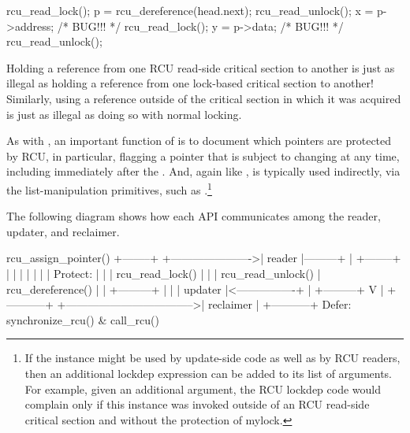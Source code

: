\begin{description}
\begin{VerbatimU}
		rcu_read_lock();
		p = rcu_dereference(head.next);
		rcu_read_unlock();
		x = p->address;	/* BUG!!! */
		rcu_read_lock();
		y = p->data;	/* BUG!!! */
		rcu_read_unlock();
\end{VerbatimU}

	Holding a reference from one RCU read-side critical section
	to another is just as illegal as holding a reference from
	one lock-based critical section to another!
	Similarly,
	using a reference outside of the critical section in which
	it was acquired is just as illegal as doing so with normal
	locking.

	As with , an important function of
	 is to document which pointers are protected by
	RCU, in particular, flagging a pointer that is subject to changing
	at any time, including immediately after the .
	And, again like ,  is
	typically used indirectly, via the  list-manipulation
	primitives, such as .\footnote{
		If the  instance might be used by
		update-side code as well as by RCU readers, then an additional
		lockdep expression can be added to its list of arguments.
		For example, given an additional  argument,
		the RCU lockdep code would complain only if this instance was
		invoked outside of an RCU read-side critical section and without
		the protection of mylock.}
\end{description}

The following diagram shows how each API communicates among the
reader, updater, and reclaimer.

\begin{VerbatimU}

	    rcu_assign_pointer()
	                            +--------+
	    +---------------------->| reader |---------+
	    |                       +--------+         |
	    |                           |              |
	    |                           |              | Protect:
	    |                           |              | rcu_read_lock()
	    |                           |              | rcu_read_unlock()
	    |        rcu_dereference()  |              |
	    +---------+                 |              |
	    | updater |<----------------+              |
	    +---------+                                V
	    |                                    +-----------+
	    +----------------------------------->| reclaimer |
	                                         +-----------+
	      Defer:
	      synchronize_rcu() & call_rcu()
\end{VerbatimU}

